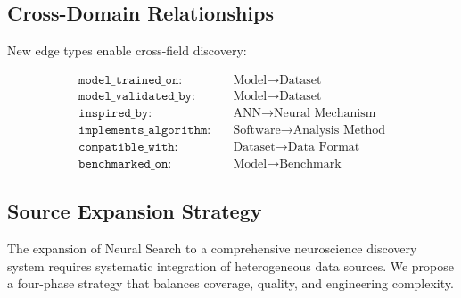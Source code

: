 \documentclass{article}
\theoremstyle{definition}
\begin{document}
\subsection{Cross-Domain Relationships}

New edge types enable cross-field discovery:

\begin{align*}
\texttt{model\_trained\_on}: &\quad \text{Model} \rightarrow \text{Dataset} \\
\texttt{model\_validated\_by}: &\quad \text{Model} \rightarrow \text{Dataset} \\
\texttt{inspired\_by}: &\quad \text{ANN} \rightarrow \text{Neural Mechanism} \\
\texttt{implements\_algorithm}: &\quad \text{Software} \rightarrow \text{Analysis Method} \\
\texttt{compatible\_with}: &\quad \text{Dataset} \rightarrow \text{Data Format} \\
\texttt{benchmarked\_on}: &\quad \text{Model} \rightarrow \text{Benchmark}
\end{align*}

\subsection{Source Expansion Strategy}

The expansion of Neural Search to a comprehensive neuroscience discovery system requires systematic integration of heterogeneous data sources. We propose a four-phase strategy that balances coverage, quality, and engineering complexity.
\end{document}

